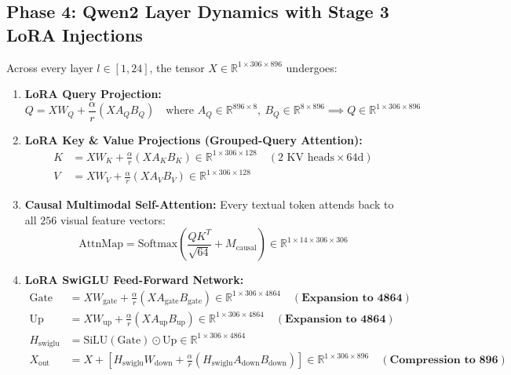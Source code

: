 \documentclass[11pt, a4paper]{article}
\begin{document}
\subsection{Phase 4: Qwen2 Layer Dynamics with Stage 3 LoRA Injections}
Across every layer $l \in [1, 24]$, the tensor $X \in \mathbb{R}^{1 \times 306 \times 896}$ undergoes:
\begin{enumerate}
    \item \textbf{LoRA Query Projection:}
    \begin{equation}
        Q = X W_Q + \frac{\alpha}{r} (X A_Q B_Q) \quad \text{where } A_Q \in \mathbb{R}^{896 \times 8},\ B_Q \in \mathbb{R}^{8 \times 896} \implies Q \in \mathbb{R}^{1 \times 306 \times 896}
    \end{equation}
    \item \textbf{LoRA Key \& Value Projections (Grouped-Query Attention):}
    \begin{align*}
        K &= X W_K + \frac{\alpha}{r} (X A_K B_K) \in \mathbb{R}^{1 \times 306 \times 128} \quad (\text{2 KV heads} \times 64\text{d}) \\
        V &= X W_V + \frac{\alpha}{r} (X A_V B_V) \in \mathbb{R}^{1 \times 306 \times 128}
    \end{align*}
    \item \textbf{Causal Multimodal Self-Attention:}
    Every textual token attends back to all $256$ visual feature vectors:
    \begin{equation}
        \text{AttnMap} = \text{Softmax}\left(\frac{Q K^T}{\sqrt{64}} + M_{\text{causal}}\right) \in \mathbb{R}^{1 \times 14 \times 306 \times 306}
    \end{equation}
    \item \textbf{LoRA SwiGLU Feed-Forward Network:}
    \begin{align*}
        \text{Gate} &= X W_{\text{gate}} + \frac{\alpha}{r}(X A_{\text{gate}} B_{\text{gate}}) \in \mathbb{R}^{1 \times 306 \times 4864} \quad (\mathbf{\text{Expansion to } 4864}) \\
        \text{Up} &= X W_{\text{up}} + \frac{\alpha}{r}(X A_{\text{up}} B_{\text{up}}) \in \mathbb{R}^{1 \times 306 \times 4864} \quad (\mathbf{\text{Expansion to } 4864}) \\
        H_{\text{swiglu}} &= \text{SiLU}(\text{Gate}) \odot \text{Up} \in \mathbb{R}^{1 \times 306 \times 4864} \\
        X_{\text{out}} &= X + \left[ H_{\text{swiglu}} W_{\text{down}} + \frac{\alpha}{r}(H_{\text{swiglu}} A_{\text{down}} B_{\text{down}}) \right] \in \mathbb{R}^{1 \times 306 \times 896} \quad (\mathbf{\text{Compression to } 896})
    \end{align*}
\end{enumerate}
\end{document}
